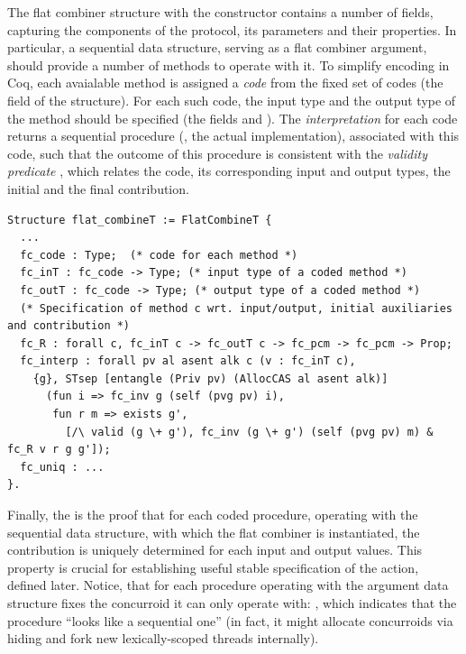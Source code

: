 The flat combiner structure  with the constructor
 contains a number of fields, capturing the
components of the protocol, its parameters and their properties. In
particular, a sequential data structure, serving as a flat combiner
argument, should provide a number of methods to operate with it. To
simplify encoding in Coq, each avaialable method is assigned a
\emph{code} from the fixed set of codes (the  field of
the structure). For each such code, the input type and the output type
of the method should be specified (the fields  and
). The \emph{interpretation}  for each
code  returns a sequential procedure (\ie, the actual
implementation), associated with this code, such that the outcome of
this procedure is consistent with the \emph{validity predicate}
, which relates the code, its corresponding input and
output types, the initial and the final contribution.

\begin{lstlisting}
Structure flat_combineT := FlatCombineT {
  ...
  fc_code : Type;  (* code for each method *)
  fc_inT : fc_code -> Type; (* input type of a coded method *)
  fc_outT : fc_code -> Type; (* output type of a coded method *)
  (* Specification of method c wrt. input/output, initial auxiliaries and contribution *)
  fc_R : forall c, fc_inT c -> fc_outT c -> fc_pcm -> fc_pcm -> Prop; 
  fc_interp : forall pv al asent alk c (v : fc_inT c), 
    {g}, STsep [entangle (Priv pv) (AllocCAS al asent alk)] 
      (fun i => fc_inv g (self (pvg pv) i), 
       fun r m => exists g', 
         [/\ valid (g \+ g'), fc_inv (g \+ g') (self (pvg pv) m) & fc_R v r g g']);
  fc_uniq : ... 
}.  
\end{lstlisting}

Finally, the  is the proof that for each coded
procedure, operating with the sequential data structure, with which
the flat combiner is instantiated, the contribution is uniquely
determined for each input and output values. This property is crucial
for establishing useful stable specification of the 
action, defined later. Notice, that for each procedure operating with
the argument data structure  fixes the concurroid it
can only operate with: , which indicates that the procedure ``looks like a sequential
one'' (in fact, it might allocate concurroids via hiding and fork new
lexically-scoped threads internally).

